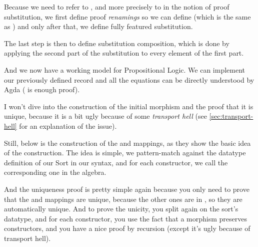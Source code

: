 \documentclass[10pt,a4paper]{article}
\begin{document}
			Because we need to refer to , and more precisely to   in the notion of proof substitution, we first define proof \emph{renamings} so we can define  (which is the same as  ) and only after that, we define fully featured substitution.
			
			\begin{tcolorbox}
				\agdasep
			\end{tcolorbox}
		
			The last step is then to define substitution composition, which is done by applying the second part of the substitution to every element of the first part.
		
			\begin{tcolorbox}
				\agda{agda/ZOL-I-11.tex}
			\end{tcolorbox}
			
			And we now have a working model for Propositional Logic. We can implement our previously defined record and all the equations can be directly understood by Agda ( is enough proof).
			
			I won't dive into the construction of the initial morphism and the proof that it is unique, because it is a bit ugly because of some \emph{transport hell} (see \autoref{sec:transport-hell} for an explanation of the issue).
			
			Still, below is the construction of the  and  mappings, as they show the basic idea of the construction. The idea is simple, we pattern-match against the datatype definition of our Sort in our syntax, and for each constructor, we call the corresponding one in the algebra.
			
			And the uniqueness proof is pretty simple again because you only need to prove that the  and  mappings are unique, because the other ones are in , so they are automatically unique. And to prove the unicity, you split again on the sort's datatype, and for each constructor, you use the fact that a morphism preserves constructors, and you have a nice proof by recursion (except it's ugly because of transport hell).
			
			\begin{tcolorbox}
				\agda{agda/ZOL-I-13.tex}
			\end{tcolorbox}
				
\end{document}
